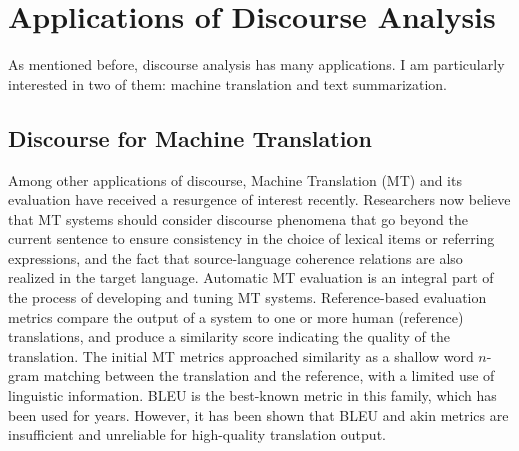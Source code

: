 \documentclass{article} %
\begin{document}
 
 

\section{Applications of Discourse Analysis} \label{discourse_app}

As mentioned before, discourse analysis has many applications. I am particularly interested in two of them: \Ni machine translation and \Nii text summarization. 




\subsection{Discourse for Machine Translation}

Among other applications of discourse, Machine Translation (MT) and its evaluation have received a resurgence of interest recently. Researchers now believe that MT systems should consider discourse phenomena that go beyond the current sentence to ensure consistency in the choice of lexical items or referring expressions, and the fact that source-language coherence relations are also realized in the target language. Automatic MT evaluation is an integral part of the process of developing and tuning MT systems. Reference-based evaluation metrics compare the output of a system to one or more human (reference) translations, and produce a similarity score indicating the quality of the translation. The initial MT metrics approached similarity as a shallow word $n$-gram matching between the translation and the reference, with a limited use of linguistic information. BLEU is the best-known metric in this family, which has been used for years. However, it has been shown that BLEU and akin metrics are insufficient and unreliable for high-quality translation output. 
\end{document}
